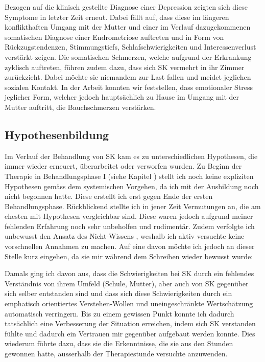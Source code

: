  Bezogen auf die klinisch gestellte Diagnose einer Depression zeigten sich diese Symptome in letzter Zeit erneut. Dabei fällt auf, dass diese im längeren konflikthaften Umgang mit der Mutter und einer im Verlauf dazugekommenen somatischen Diagnose einer Endrometriose auftreten und in  Form von Rückzugstendenzen, Stimmungstiefs, Schlafschwierigkeiten und Interessenverlust verstärkt zeigen. Die somatischen Schmerzen, welche aufgrund der Erkrankung zyklisch auftreten, führen zudem dazu, dass sich SK vermehrt in ihr Zimmer zurückzieht. Dabei möchte sie niemandem zur Last fallen und meidet jeglichen sozialen Kontakt. In der Arbeit konnten wir feststellen, dass emotionaler Stress jeglicher Form, welcher jedoch hauptsächlich zu Hause im Umgang mit der Mutter auftritt, die Bauchschmerzen verstärken.
 
\subsection{Hypothesenbildung} 
Im Verlauf der Behandlung von SK kam es zu unterschiedlichen Hypothesen, die immer wieder erneuert, überarbeitet oder verworfen wurden. Zu Beginn der Therapie in Behandlungsphase I (siehe Kapitel ) stellt ich noch keine expliziten Hypothesen gemäss dem systemischen Vorgehen, da ich mit der Ausbildung noch nicht begonnen hatte. Diese erstellt ich erst gegen Ende der ersten Behandlungsphase. Rückblickend stellte ich in jener Zeit Vermutungen an, die am ehesten mit Hypothesen vergleichbar sind. Diese waren jedoch aufgrund meiner fehlenden Erfahrung noch sehr unbeholfen und rudimentär. Zudem verfolgte ich unbewusst den Ansatz des Nicht-Wissens \cite{Anderson1992}, weshalb ich aktiv versuchte keine vorschnellen Annahmen zu machen. Auf eine davon möchte ich jedoch an dieser Stelle kurz eingehen, da sie mir während dem Schreiben wieder bewusst wurde: 

Damals ging ich davon aus, dass die Schwierigkeiten bei SK durch ein fehlendes Verständnis von ihrem Umfeld (Schule, Mutter), aber auch  von SK gegenüber sich selber entstanden sind und dass sich diese Schwierigkeiten durch ein emphatisch orientiertes Verstehen-Wollen und uneingeschränkte Wertschätzung automatisch verringern. Bis zu einem gewissen Punkt konnte ich dadurch tatsächlich eine Verbesserung der Situation erreichen, indem sich SK verstanden fühlte und dadurch ein Vertrauen mir gegenüber aufgebaut werden konnte. Dies wiederum führte dazu, dass sie die Erkenntnisse, die sie aus den Stunden gewonnen hatte, ausserhalb der Therapiestunde versuchte anzuwenden.

